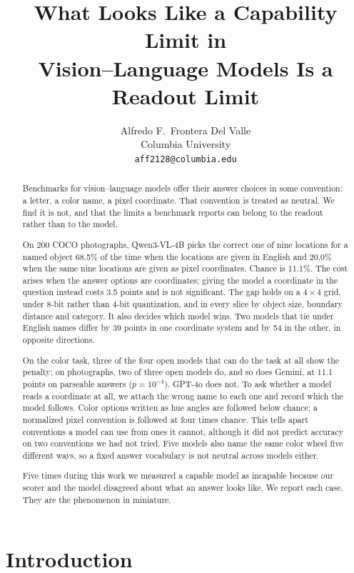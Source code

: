 \documentclass{article}
\title{What Looks Like a Capability Limit in\\Vision--Language Models Is a Readout Limit}
\author{Alfredo F.\ Frontera Del Valle\\
Columbia University\\
\texttt{aff2128@columbia.edu}}
\begin{document}
\maketitle
{}
\thispagestyle{fancy}

\begin{abstract}
Benchmarks for vision--language models offer their answer choices in some
convention: a letter, a color name, a pixel coordinate. That convention is
treated as neutral. We find it is not, and that the limits a benchmark reports can
belong to the readout rather than to the model.

On 200 COCO photographs, Qwen3-VL-4B picks the correct one of nine locations for a
named object 68.5\% of the time when the locations are given in English and
20.0\% when the same nine locations are given as pixel coordinates. Chance is
11.1\%. The cost arises when the answer options are coordinates; giving the
model a coordinate in the question instead costs 3.5 points and is not
significant. The gap holds on a $4\times4$ grid, under 8-bit rather than 4-bit
quantization, and in every slice by object size, boundary distance and category. It also decides which model wins. Two models that
tie under English names differ by 39 points in one coordinate system and by 54 in
the other, in opposite directions.

On the color task, three of the four open models that can do the task at all show
the penalty; on photographs, two of three open models do, and so does Gemini, at
11.1 points on parseable answers ($p=10^{-4}$). GPT-4o does not. To ask whether a model reads a
coordinate at all, we attach the wrong name to each one and record which the model
follows. Color options written as hue angles are followed below chance; a
normalized pixel convention is followed at four times chance. This tells apart conventions a model can use from
ones it cannot, although it did not predict accuracy on two conventions we had not
tried. Five models also name the same color wheel five different ways, so a fixed
answer vocabulary is not neutral across models either.

Five times during this work we measured a capable model as incapable because our
scorer and the model disagreed about what an answer looks like. We report each
case. They are the phenomenon in miniature.
\end{abstract}

\section{Introduction}
\end{document}
